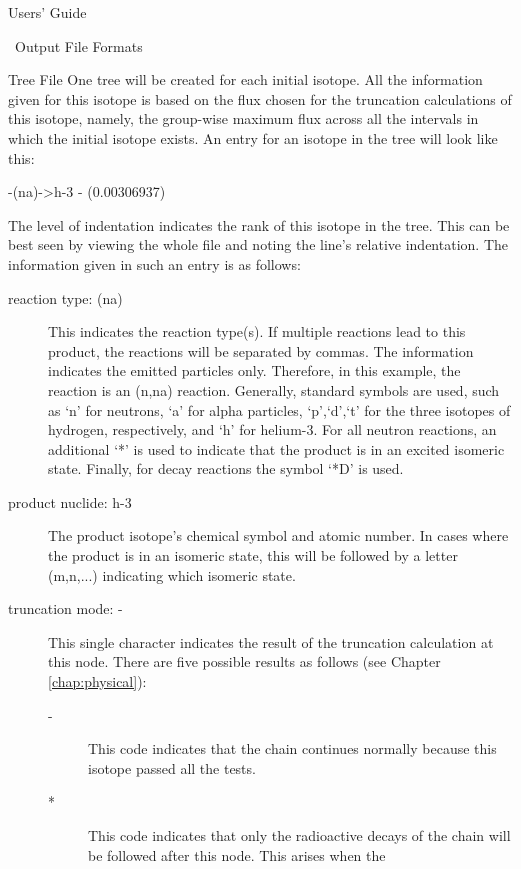 \begin{chapter}{Users' Guide\label{app:user.guide}}
\begin{section}{\ALARA\ Output File Formats\label{app:user.output}}
\begin{subsection}{Tree File\label{app:user.output.tree}}
      One tree will be created for each initial isotope.  All the
      information given for this isotope is based on the flux chosen
      for the truncation calculations of this isotope, namely, the
      group-wise maximum flux across all the intervals in which the
      initial isotope exists.  An entry for an isotope in the tree
      will look like this:
      \begin{center}
        \begin{boxedverbatim}
-(na)->h-3 - (0.00306937)
\end{boxedverbatim}
      \end{center}
      The level of indentation indicates the rank of this isotope in
      the tree.  This can be best seen by viewing the whole file and
      noting the line's relative indentation.  The information given
      in such an entry is as follows:
      \begin{description}
      \item[reaction type: (na)] This indicates the reaction type(s).
        If multiple reactions lead to this product, the reactions will
        be separated by commas.  The information indicates the emitted
        particles only.  Therefore, in this example, the reaction is
        an (n,na) reaction.  Generally, standard symbols are used,
        such as `n' for neutrons, `a' for alpha particles, `p',`d',`t'
        for the three isotopes of hydrogen, respectively, and `h' for
        helium-3. For all neutron reactions, an additional `*' is used
        to indicate that the product is in an excited isomeric state.
        Finally, for decay reactions the symbol `*D' is used.
      \item[product nuclide: h-3] The product isotope's chemical
        symbol and atomic number.  In cases where the product is in an
        isomeric state, this will be followed by a letter (m,n,...)
        indicating which isomeric state.
      \item[truncation mode: -] This single character indicates the result
        of the truncation calculation at this node.  There are five possible
        results as follows (see Chapter \ref{chap:physical}):
        \begin{description}
        \item[-] This code indicates that the chain continues normally
          because this isotope passed all the tests.
        \item[*] This code indicates that only the radioactive decays of the
          chain will be followed after this node.  This arises when the

\end{description}
\end{description}
\end{subsection}
\end{section}
\end{chapter}
